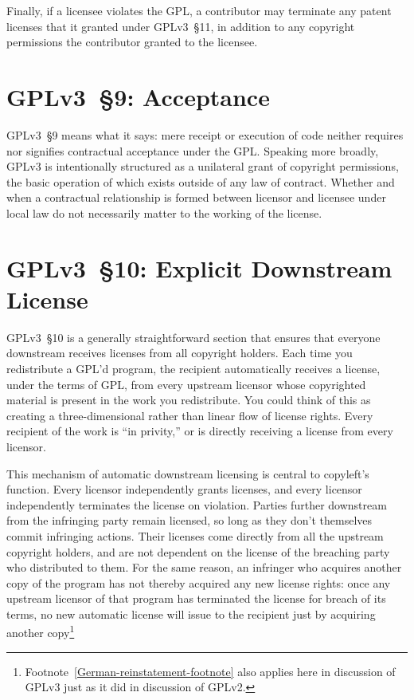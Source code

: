 Finally, if a licensee violates the GPL, a contributor may terminate any
patent licenses that it granted under GPLv3~\S11, in addition to any
copyright permissions the contributor granted to the licensee.


\section{GPLv3~\S9: Acceptance}

GPLv3~\S9 means what it says: mere receipt or execution of code neither
requires nor signifies contractual acceptance under the GPL.  Speaking more
broadly, GPLv3 is intentionally structured as a unilateral grant
of copyright permissions, the basic operation of which exists outside of any
law of contract.  Whether and when a contractual relationship is formed
between licensor and licensee under local law do not necessarily matter to
the working of the license.

\section{GPLv3~\S10: Explicit Downstream License}
\label{GPLv3s10}

GPLv3~\S10 is a generally straightforward section that ensures that everyone
downstream receives licenses from all copyright holders.  Each time you
redistribute a GPL'd program, the recipient automatically receives a license,
under the terms of GPL, from every upstream licensor whose copyrighted
material is present in the work you redistribute.  You could think of this as
creating a three-dimensional rather than linear flow of license rights.
Every recipient of the work is ``in privity,'' or is directly receiving a
license from every licensor.

This mechanism of automatic downstream licensing is central to copyleft's
function.  Every licensor independently grants licenses, and every licensor
independently terminates the license on violation.  Parties further
downstream from the infringing party remain licensed, so long as they don't
themselves commit infringing actions.  Their licenses come directly from all
the upstream copyright holders, and are not dependent on the license of the breaching
party who distributed to them.  For the same reason, an infringer who acquires
another copy of the program has not thereby acquired any new license rights:
once any upstream licensor of that program has terminated the license for
breach of its terms, no new automatic license will issue to the recipient
just by acquiring another
copy\footnote{Footnote~\ref{German-reinstatement-footnote} also applies here
  in discussion of GPLv3 just as it did in discussion of GPLv2.}

